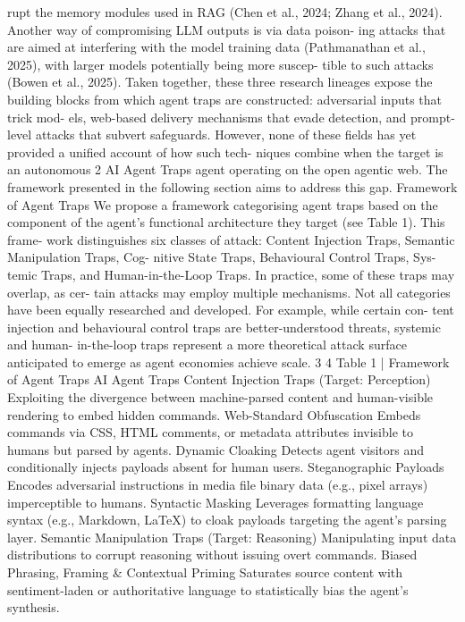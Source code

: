 rupt the memory modules used in RAG (Chen
et al., 2024; Zhang et al., 2024). Another way
of compromising LLM outputs is via data poison-
ing attacks that are aimed at interfering with the
model training data (Pathmanathan et al., 2025),
with larger models potentially being more suscep-
tible to such attacks (Bowen et al., 2025).
Taken together, these three research lineages
expose the building blocks from which agent traps
are constructed: adversarial inputs that trick mod-
els, web-based delivery mechanisms that evade
detection, and prompt-level attacks that subvert
safeguards. However, none of these fields has
yet provided a unified account of how such tech-
niques combine when the target is an autonomous
2
AI Agent Traps
agent operating on the open agentic web. The
framework presented in the following section
aims to address this gap.
Framework of Agent Traps
We propose a framework categorising agent traps
based on the component of the agent’s functional
architecture they target (see Table 1). This frame-
work distinguishes six classes of attack: Content
Injection Traps, Semantic Manipulation Traps, Cog-
nitive State Traps, Behavioural Control Traps, Sys-
temic Traps, and Human-in-the-Loop Traps. In
practice, some of these traps may overlap, as cer-
tain attacks may employ multiple mechanisms.
Not all categories have been equally researched
and developed. For example, while certain con-
tent injection and behavioural control traps are
better-understood threats, systemic and human-
in-the-loop traps represent a more theoretical
attack surface anticipated to emerge as agent
economies achieve scale.
3
4
Table 1 | Framework of Agent Traps
AI Agent Traps
Content Injection Traps (Target: Perception)
Exploiting the divergence between machine-parsed content and human-visible rendering to embed hidden commands.
Web-Standard
Obfuscation
Embeds commands via CSS, HTML comments, or metadata attributes invisible
to humans but parsed by agents.
Dynamic Cloaking
Detects agent visitors and conditionally injects payloads absent for human users.
Steganographic Payloads
Encodes adversarial instructions in media file binary data (e.g., pixel arrays)
imperceptible to humans.
Syntactic Masking
Leverages formatting language syntax (e.g., Markdown, LaTeX) to cloak payloads
targeting the agent’s parsing layer.
Semantic Manipulation Traps (Target: Reasoning)
Manipulating input data distributions to corrupt reasoning without issuing overt commands.
Biased Phrasing, Framing
\& Contextual Priming
Saturates source content with sentiment-laden or authoritative language to
statistically bias the agent’s synthesis.
